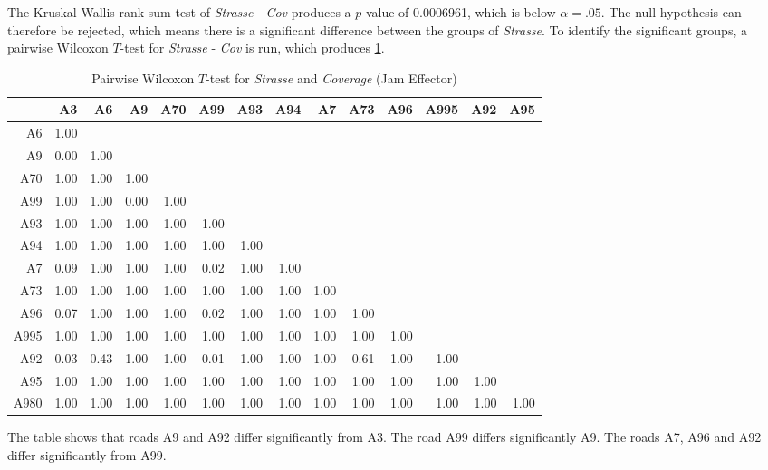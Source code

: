 The Kruskal-Wallis rank sum test of \textit{Strasse} - \textit{Cov} produces a $p$-value of 0.0006961, which is below $\alpha=.05$. The null hypothesis can therefore be rejected, which means there is a significant difference between the groups of \textit{Strasse}. To identify the significant groups, a pairwise Wilcoxon $T$-test for \textit{Strasse} - \textit{Cov} is run, which produces \cref{tbl:wilcoxon_baysis_effector_Strasse_Cov}. 
\begin{table}[ht]
	\tiny
	\centering
	\begin{tabular}{rrrrrrrrrrrrrr}
		\toprule
			 & A3 & A6 & A9 & A70 & A99 & A93 & A94 & A7 & A73 & A96 & A995 & A92 & A95 \\ 
		\midrule
		A6   & 1.00 &  &  &  &  &  &  &  &  &  &  &  &  \\ 
		A9   & 0.00 & 1.00 &  &  &  &  &  &  &  &  &  &  &  \\ 
		A70  & 1.00 & 1.00 & 1.00 &  &  &  &  &  &  &  &  &  &  \\ 
		A99  & 1.00 & 1.00 & 0.00 & 1.00 &  &  &  &  &  &  &  &  &  \\ 
		A93  & 1.00 & 1.00 & 1.00 & 1.00 & 1.00 &  &  &  &  &  &  &  &  \\ 
		A94  & 1.00 & 1.00 & 1.00 & 1.00 & 1.00 & 1.00 &  &  &  &  &  &  &  \\ 
		A7   & 0.09 & 1.00 & 1.00 & 1.00 & 0.02 & 1.00 & 1.00 &  &  &  &  &  &  \\ 
		A73  & 1.00 & 1.00 & 1.00 & 1.00 & 1.00 & 1.00 & 1.00 & 1.00 &  &  &  &  &  \\ 
		A96  & 0.07 & 1.00 & 1.00 & 1.00 & 0.02 & 1.00 & 1.00 & 1.00 & 1.00 &  &  &  &  \\ 
		A995 & 1.00 & 1.00 & 1.00 & 1.00 & 1.00 & 1.00 & 1.00 & 1.00 & 1.00 & 1.00 &  &  &  \\ 
		A92  & 0.03 & 0.43 & 1.00 & 1.00 & 0.01 & 1.00 & 1.00 & 1.00 & 0.61 & 1.00 & 1.00 &  &  \\ 
		A95  & 1.00 & 1.00 & 1.00 & 1.00 & 1.00 & 1.00 & 1.00 & 1.00 & 1.00 & 1.00 & 1.00 & 1.00 &  \\ 
		A980 & 1.00 & 1.00 & 1.00 & 1.00 & 1.00 & 1.00 & 1.00 & 1.00 & 1.00 & 1.00 & 1.00 & 1.00 & 1.00 \\ 
		\bottomrule
	  \end{tabular}
    \caption{Pairwise Wilcoxon $T$-test for \textit{Strasse} and \textit{Coverage} (Jam Effector)}
    \label{tbl:wilcoxon_baysis_effector_Strasse_Cov}
\end{table}
The table shows that roads A9 and A92 differ significantly from A3. The road A99 differs significantly A9. The roads A7, A96 and A92 differ significantly from A99.
